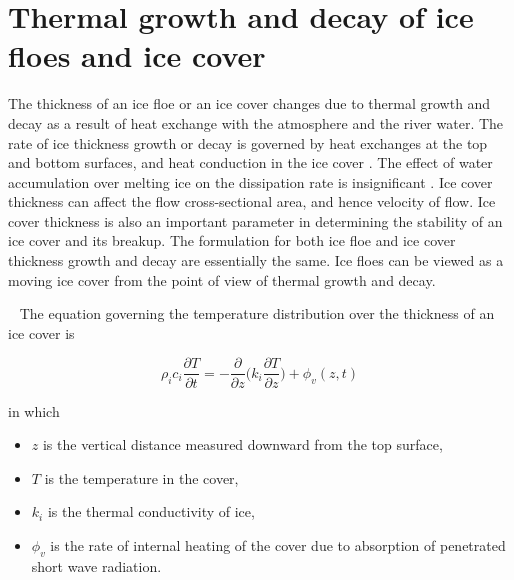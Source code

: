 \section{Thermal growth and decay of ice floes and ice cover}
\label{section:thermal_growth_icover}

The thickness of an ice floe or an ice cover changes due to thermal growth and decay as a result of heat exchange with the atmosphere and the river water. The rate of ice thickness growth or decay is governed by heat exchanges at the top and bottom surfaces, and heat conduction in the ice cover \cite{Shen&Chiang1984}. The effect of water accumulation over melting ice on the
dissipation rate is insignificant \cite{Wake1979}. Ice cover thickness can affect the flow cross-sectional area, and hence velocity of flow. Ice cover thickness is also an important parameter in determining the stability of an ice cover and its breakup. The formulation for both ice floe and ice cover thickness growth and decay are essentially the same. Ice floes can be viewed as a moving ice cover from the point of view of thermal growth and decay.

~\newline
The equation governing the temperature distribution over the thickness of an ice cover is

\begin{equation} \label{eq:temp_distibrution}
\rho_i c_i \dfrac{\partial T}{\partial t} = -\dfrac{\partial}{\partial z} \Big(k_i \dfrac{\partial T}{\partial z}\Big) + \phi_v(z,t)
\end{equation}

in which
\begin{itemize}
    \item $z$ is the vertical distance measured downward from the top surface,
    \item $T$ is the temperature in the cover,
    \item $k_i$ is the thermal conductivity of ice,
    \item $\phi_v$ is the rate of internal heating of the cover due to absorption of penetrated short wave radiation.
\end{itemize}

